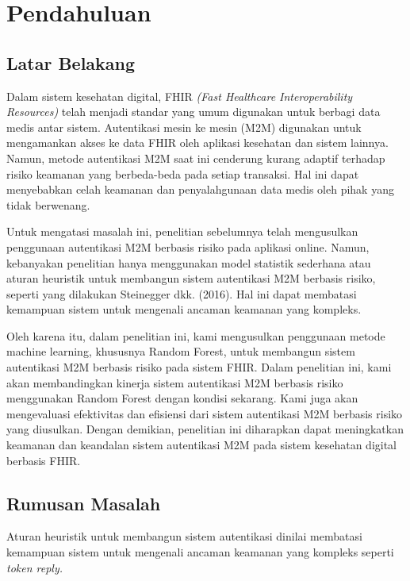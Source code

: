 \chapter{Pendahuluan}

\section{Latar Belakang}

Dalam sistem kesehatan digital, FHIR \textit{(Fast Healthcare Interoperability
Resources)} telah menjadi standar yang umum digunakan untuk berbagi data medis
antar sistem. Autentikasi mesin ke mesin (M2M) digunakan untuk mengamankan
akses ke data FHIR oleh aplikasi kesehatan dan sistem lainnya. Namun, metode
autentikasi M2M saat ini cenderung kurang adaptif terhadap risiko keamanan yang
berbeda-beda pada setiap transaksi. Hal ini dapat menyebabkan celah keamanan
dan penyalahgunaan data medis oleh pihak yang tidak berwenang.

Untuk mengatasi masalah ini, penelitian sebelumnya telah mengusulkan
penggunaan autentikasi M2M berbasis risiko pada aplikasi online. Namun,
kebanyakan penelitian hanya menggunakan model statistik sederhana atau aturan
heuristik untuk membangun sistem autentikasi M2M berbasis risiko, seperti yang
dilakukan Steinegger dkk. (2016). Hal ini dapat membatasi kemampuan sistem
untuk mengenali ancaman keamanan yang kompleks.

Oleh karena itu, dalam penelitian ini, kami mengusulkan penggunaan metode
machine learning, khususnya Random Forest, untuk membangun sistem autentikasi
M2M berbasis risiko pada sistem FHIR. Dalam penelitian ini, kami akan
membandingkan kinerja sistem autentikasi M2M berbasis risiko menggunakan
Random Forest dengan kondisi sekarang. Kami juga akan mengevaluasi efektivitas
dan efisiensi dari sistem autentikasi M2M berbasis risiko yang diusulkan. Dengan
demikian, penelitian ini diharapkan dapat meningkatkan keamanan dan keandalan
sistem autentikasi M2M pada sistem kesehatan digital berbasis FHIR.


\section{Rumusan Masalah}

Aturan heuristik untuk membangun sistem autentikasi dinilai membatasi
kemampuan sistem untuk mengenali ancaman keamanan yang kompleks seperti \textit{token reply.}


